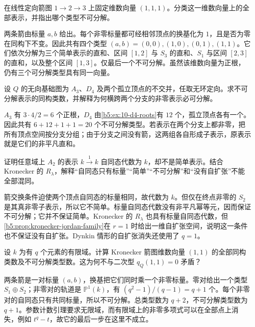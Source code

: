 \begin{optionalexercise}\label{b5:ex:10-a3-fixed-dimension}
	在线性定向箭图 \(1\to2\to3\) 上固定维数向量 \((1,1,1)\)。分类这一维数向量上的全部表示，并指出哪个类型不可分解。
\end{optionalexercise}
\begin{solution}
	两条箭由标量 \(a,b\) 给出。每个非零标量都可经相邻顶点的换基化为 \(1\)，且是否为零在同构下不变。因此共有四个类型 \((a,b)=(0,0),(1,0),(0,1),(1,1)\)。它们依次分解为三个简单表示的直和、区间 \([1,2]\) 与 \(S_3\) 的直和、\(S_1\) 与区间 \([2,3]\) 的直和，以及整个区间 \([1,3]\)。仅最后一个不可分解。虽然该维数向量为正根，仍有三个可分解类型具有同一向量。
\end{solution}

\begin{optionalexercise}\label{b5:ex:10-disconnected-count}
	设 \(Q\) 的无向基础图为 \(A_3\)、\(D_4\) 及两个孤立顶点的不交并，任取无环定向。求不可分解表示的同构类数，并解释为何横跨两个分支的非零表示必可分解。
\end{optionalexercise}
\begin{solution}
	\(A_3\) 有 \(3\cdot4/2=6\) 个正根，\(D_4\) 由\cref{b5:ex:10-d4-roots}有 \(12\) 个，孤立顶点各有一个。因此共有 \(6+12+1+1=20\) 个不可分解类型。若表示在两个分支上都非零，把所有顶点空间按分支分组；由于分支之间没有箭，这两组各自形成子表示，原表示就是它们的非平凡直和。
\end{solution}

\begin{optionalexercise}\label{b5:ex:10-root-end-not-converse}
	证明任意域上 \(A_2\) 的表示 \(k\xrightarrow{1}k\) 自同态代数为 \(k\)，却不是简单表示。结合 Kronecker 的 \(R_\lambda\)，解释“自同态只有标量”“简单”“不可分解”和“没有自扩张”不能全部混同。
\end{optionalexercise}
\begin{solution}
	箭交换条件迫使两个顶点自同态的标量相同，故代数为 \(k\)。但仅在终点非零的 \(S_2\) 是其真非零子表示，所以它不简单。标量自同态代数没有非平凡幂等元，因而保证不可分解；它并不保证简单。Kronecker 的 \(R_\lambda\) 也具有标量自同态代数，但\cref{b5:prop:kronecker-jordan-family}在 \(r=1\) 时给出一维自扩张空间，说明这一条件也不保证没有自扩张。Dynkin 情形的自扩张消失还使用了 \(q=1\)。
\end{solution}

\begin{optionalexercise}\label{b5:ex:10-finite-field-orbits}
	设 \(k\) 为有 \(q\) 个元素的有限域。计算 Kronecker 箭图维数向量 \((1,1)\) 的全部同构类数及不可分解类型数。这为何不与二次型 \(q_Q(1,1)=0\) 矛盾？
\end{optionalexercise}
\begin{solution}
	两条箭是一对标量 \((a,b)\)，换基把它们同时乘一个非零标量。零对给出一个类型 \(S_1\oplus S_2\)；非零对的轨道是 \(\mathbb P^1(k)\)，有 \((q^2-1)/(q-1)=q+1\) 个。每个非零对的自同态只有共同标量，所以不可分解。总类型数为 \(q+2\)，不可分解类型数为 \(q+1\)。参数计数引理要求无限域，而有限域上的非零多项式可以在全部点上消失，例如 \(t^q-t\)，故它的最后一步在这里不成立。
\end{solution}

